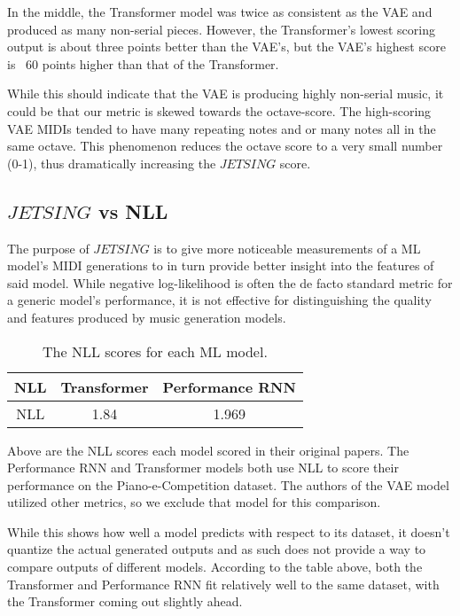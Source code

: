 \documentclass[11pt]{article}
\begin{document}
In the middle, the Transformer model was twice as consistent as the VAE and produced as many non-serial pieces.
However, the Transformer's lowest scoring output is about three points better than the VAE's, but the VAE's highest score is ~60 points higher than that of the Transformer. 

While this should indicate that the VAE is producing highly non-serial music, it could be that our metric is skewed towards the octave-score.
The high-scoring VAE MIDIs tended to have many repeating notes and or many notes all in the same octave.
This phenomenon reduces the octave score to a very small number (0-1), thus dramatically increasing the $JETSING$ score.

\subsection{$JETSING$ vs NLL}

The purpose of $JETSING$ is to give more noticeable measurements of a ML model's MIDI generations to in turn provide better insight into the features of said model.
While negative log-likelihood is often the de facto standard metric for a generic model's performance,
it is not effective for distinguishing the quality and features produced by music generation models.

\begin{table}[h!]
    \centering
    \caption{The NLL scores for each ML model.}
    \begin{tabular}{c c c}
        \hline
        NLL & Transformer & Performance RNN \\
        \hline
        NLL & 1.84 & 1.969 \\
        \hline
    \end{tabular}
\end{table}

Above are the NLL scores each model scored in their original papers.
The Performance RNN and Transformer models both use NLL to score their performance on the Piano-e-Competition dataset.
The authors of the VAE model utilized other metrics, so we exclude that model for this comparison.

While this shows how well a model predicts with respect to its dataset, it doesn't quantize the actual generated outputs and as such does not provide a way to compare outputs of different models.
According to the table above, both the Transformer and Performance RNN fit relatively well to the same dataset, with the Transformer coming out slightly ahead.
\end{document}
